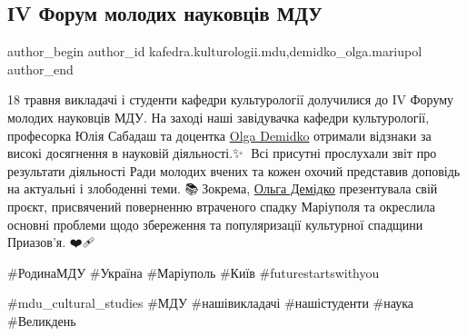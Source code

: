  
 
 
 
 

\subsection{ІV Форум молодих науковців МДУ}
\label{sec:18_05_2023.fb.kafedra.kulturologii.mdu.1.iv_forum_molodyh_naukovciv_mdu}
 
\ifcmt
 author_begin
   author_id kafedra.kulturologii.mdu,demidko_olga.mariupol
 author_end
\fi

18 травня викладачі і студенти кафедри культурології долучилися до ІV Форуму
молодих науковців МДУ. На заході наші завідувачка кафедри культурології,
професорка Юлія Сабадаш та доцентка \href{\urlDemidkoIA}{Olga Demidko} отримали відзнаки за високі
досягнення в науковій діяльності.✨️👏 Всі присутні прослухали звіт про
результати діяльності Ради молодих вчених та кожен охочий представив доповідь
на актуальні і злободенні теми. 📚📑Зокрема, \href{\urlDemidkoIA}{Ольга Демідко} презентувала свій
проєкт, присвячений поверненню втраченого спадку Маріуполя та окреслила основні
проблеми щодо збереження та популяризації культурної спадщини Приазов'я.
❤️🩹 

\#РодинаМДУ  \#Україна \#Маріуполь \#Київ  \#futurestartswithyou

\#mdu\_cultural\_studies \#МДУ \#нашівикладачі \#нашістуденти \#наука \#Великдень
